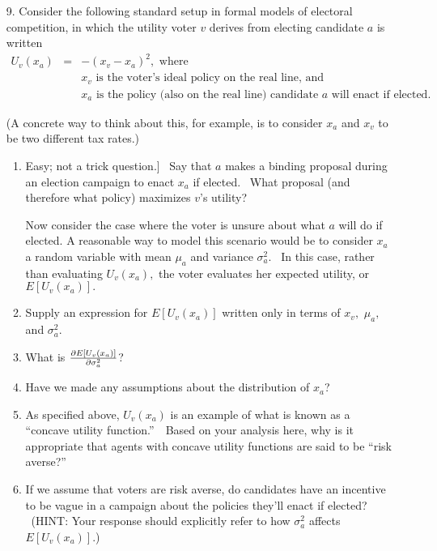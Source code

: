 \documentclass[11pt]{article}
\begin{document}
\begin{enumerate}
\item[9.] Consider the following standard setup in formal models of
electoral competition, in which the utility voter $v$ derives from electing
candidate $a$ is written 
\begin{eqnarray*}
U_{v}\left( x_{a}\right)  &=&-\left( x_{v}-x_{a}\right) ^{2},\text{ where} \\
&&x_{v}\text{ is the voter's ideal policy on the real line, and} \\
&&x_{a}\text{ is the policy (also on the real line) candidate }a\text{ will
enact if elected.}
\end{eqnarray*}

(A concrete way to think about this, for example, is to consider $x_{a}$ and 
$x_{v}$ to be two different tax rates.)

\begin{enumerate}
\item \lbrack Easy; not a trick question.] \ Say that $a$ makes a binding
proposal during an election campaign to enact $x_{a}$ if elected. \ What
proposal (and therefore what policy) maximizes $v$'s utility?\medskip

Now consider the case where the voter is unsure about what $a$ will do if
elected. A reasonable way to model this scenario would be to consider $x_{a}$
a random variable with mean $\mu _{a}$ and variance $\sigma _{a}^{2}.$ \ In
this case, rather than evaluating $U_{v}\left( x_{a}\right) ,$ the voter
evaluates her expected utility, or $E\left[ U_{v}\left( x_{a}\right) \right]
.$\medskip

\item Supply an expression for $E\left[ U_{v}\left( x_{a}\right) \right] $
written only in terms of $x_{v},$ $\mu _{a},$ and $\sigma _{a}^{2}.$\medskip

\item What is $\frac{\partial E\left[ U_{v}\left( x_{a}\right) \right] }{%
\partial \sigma _{a}^{2}}$?\medskip

\item Have we made any assumptions about the distribution of $x_{a}$? \
\medskip 

\item As specified above, $U_{v}\left( x_{a}\right) $ is an example of what
is known as a \textquotedblleft concave utility function.\textquotedblright\
\ Based on your analysis here, why is it appropriate that agents with
concave utility functions are said to be \textquotedblleft risk
averse?\textquotedblright \medskip 

\item If we assume that voters are risk averse, do candidates have an
incentive to be vague in a campaign about the policies they'll enact if
elected? \ (HINT: Your response should explicitly refer to how $\sigma
_{a}^{2}$ affects $E\left[ U_{v}\left( x_{a}\right) \right] $.) \medskip
\end{enumerate}
\end{enumerate}
\end{document}
